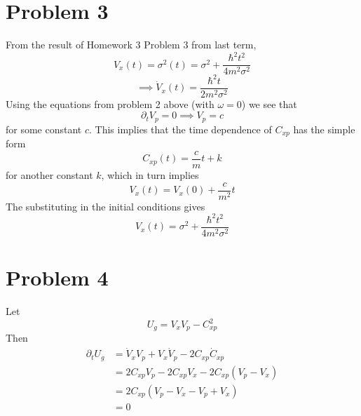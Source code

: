 \documentclass[12pt]{article}
\begin{document}
\section*{Problem 3}
From the result of Homework 3 Problem 3 from last term,
\[ V_x(t) = \sigma^2(t) = \sigma^2 + \frac{\hbar^2t^2}{4m^2\sigma^2} \]
\[ \implies \dot{V}_x(t) = \frac{\hbar^2t}{2m^2\sigma^2} \]
Using the equations from problem 2 above (with $\omega = 0$) we see that
\[ \partial_tV_p = 0 \implies V_p = c \]
for some constant $c$. This implies that the time dependence of $C_{xp}$ has the simple form 
\[ C_{xp}(t) = \frac{c}{m}t + k \]
for another constant $k$, which in turn implies
\[ V_x(t) = V_x(0) + \frac{c}{m^2}t \]
The substituting in the initial conditions gives
\[ V_x(t) = \sigma^2 + \frac{\hbar^2t^2}{4m^2\sigma^2} \]


\section*{Problem 4}
Let 
\[ U_g = V_x V_p - C_{xp}^2 \]
Then
\begin{align*}
    \partial_tU_g & = \dot{V}_xV_p + V_x\dot{V}_p - 2C_{xp}\dot{C}_{xp} \\
    & = 2C_{xp}V_p -2C_{xp}V_x - 2C_{xp}(V_p-V_x) \\
    & = 2C_{xp}(V_p - V_x - V_p + V_x) \\
    & = 0
\end{align*}
\end{document}
